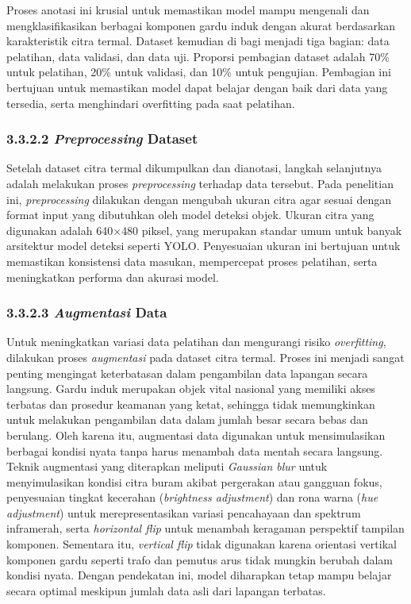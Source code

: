 Proses anotasi ini krusial untuk memastikan model mampu mengenali dan mengklasifikasikan berbagai komponen gardu induk dengan akurat berdasarkan karakteristik citra termal. Dataset kemudian di bagi menjadi tiga bagian: data pelatihan, data validasi, dan data uji. Proporsi pembagian dataset adalah 70\% untuk pelatihan, 20\% untuk validasi, dan 10\% untuk pengujian. Pembagian ini bertujuan untuk memastikan model dapat belajar dengan baik dari data yang tersedia, serta menghindari overfitting pada saat pelatihan.

\subsubsection{3.3.2.2 \emph{Preprocessing} Dataset}
Setelah dataset citra termal dikumpulkan dan dianotasi, langkah selanjutnya adalah melakukan proses \emph{preprocessing} terhadap data tersebut. Pada penelitian ini, \emph{preprocessing} dilakukan dengan mengubah ukuran citra agar sesuai dengan format input yang dibutuhkan oleh model deteksi objek. Ukuran citra yang digunakan adalah 640$\times$480 piksel, yang merupakan standar umum untuk banyak arsitektur model deteksi seperti YOLO. Penyesuaian ukuran ini bertujuan untuk memastikan konsistensi data masukan, mempercepat proses pelatihan, serta meningkatkan performa dan akurasi model.


\subsubsection{3.3.2.3 \emph{Augmentasi} Data}
Untuk meningkatkan variasi data pelatihan dan mengurangi risiko \emph{overfitting}, dilakukan proses \emph{augmentasi} pada dataset citra termal. Proses ini menjadi sangat penting mengingat keterbatasan dalam pengambilan data lapangan secara langsung. Gardu induk merupakan objek vital nasional yang memiliki akses terbatas dan prosedur keamanan yang ketat, sehingga tidak memungkinkan untuk melakukan pengambilan data dalam jumlah besar secara bebas dan berulang. Oleh karena itu, augmentasi data digunakan untuk mensimulasikan berbagai kondisi nyata tanpa harus menambah data mentah secara langsung. Teknik augmentasi yang diterapkan meliputi \emph{Gaussian blur} untuk menyimulasikan kondisi citra buram akibat pergerakan atau gangguan fokus, penyesuaian tingkat kecerahan (\emph{brightness adjustment}) dan rona warna (\emph{hue adjustment}) untuk merepresentasikan variasi pencahayaan dan spektrum inframerah, serta \emph{horizontal flip} untuk menambah keragaman perspektif tampilan komponen. Sementara itu, \emph{vertical flip} tidak digunakan karena orientasi vertikal komponen gardu seperti trafo dan pemutus arus tidak mungkin berubah dalam kondisi nyata. Dengan pendekatan ini, model diharapkan tetap mampu belajar secara optimal meskipun jumlah data asli dari lapangan terbatas.

